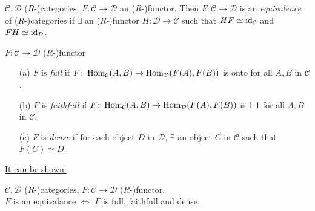 \begin{defin}
$\mathcal{C}, \mathcal{D}$ ($R$-)categories, $F\colon  \mathcal{C} \to
\mathcal{D}$ an ($R$-)functor. Then $F\colon  \mathcal{C} \to
\mathcal{D}$ is an \emph{equivalence} of ($R$-)categories if $\exists$
an ($R$-)functor $H\colon  \mathcal{D} \to \mathcal{C}$ such that $HF
\simeq \operatorname{id}\nolimits_\mathcal{C}$ and $FH \simeq \operatorname{id}\nolimits_\mathcal{D}$. 
\end{defin}

\begin{defin}
$F\colon  \mathcal{C} \to \mathcal{D}$ ($R$-)functor
\begin{enumerate}
\item[(a)] $F$ is \emph{full} if $F\colon  \operatorname{Hom}_\mathcal{C}(A,B) \to
  \operatorname{Hom}_\mathcal{D}(F(A), F(B))$ is onto for all $A, B$ in
  $\mathcal{C}$. 
\item[(b)] $F$ is \emph{faithfull} if
  $F\colon \operatorname{Hom}_\mathcal{C}(A,B) \to \operatorname{Hom}_\mathcal{D}(F(A), F(B))$ is
  1-1 for all $A, B$ in $\mathcal{C}$. 
\item[(c)] $F$ is \emph{dense} if for each object $D$ in
  $\mathcal{D}$, $\exists$ an object $C$ in $\mathcal{C}$ such that
  $F(C) \simeq D$.
\end{enumerate}
\end{defin}

\underline{It can be shown:}
\begin{prop}
$\mathcal{C}, \mathcal{D}$ ($R$-)categories, $F\colon  \mathcal{C} \to
\mathcal{D}$ ($R$-)functor.\\
$F$ is an equivalance $\iff$ $F$ is full, faithfull and dense. 
\end{prop}

